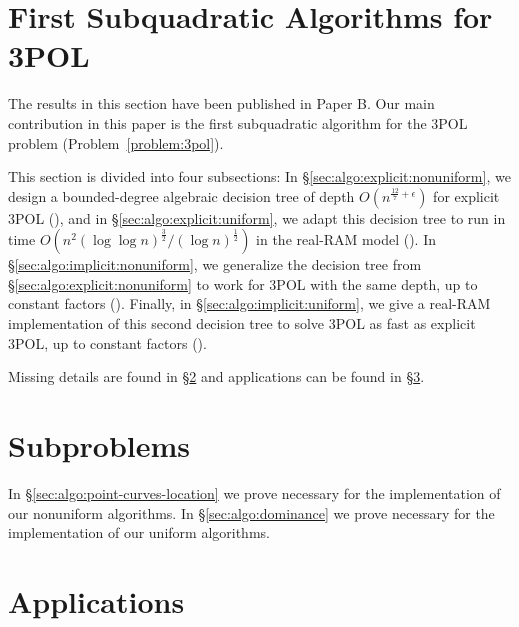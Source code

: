 \section{First Subquadratic Algorithms for 3POL}

The results in this section have been published in Paper B.
Our main contribution in this paper is the first subquadratic algorithm for
the 3POL problem (Problem~\ref{problem:3pol}).

This section is divided into four subsections:
%
In \S\ref{sec:algo:explicit:nonuniform},
we design a bounded-degree
algebraic decision tree
of depth $O(n^{\frac{12}{7}+\epsilon})$
for explicit 3POL (), and in
\S\ref{sec:algo:explicit:uniform}, we adapt this decision tree
to run in time $O(n^2 {(\log \log n)}^{\frac 32} / {(\log n)}^{\frac 12})$
in the real-RAM model ().
%
In \S\ref{sec:algo:implicit:nonuniform}, we generalize the decision tree from
\S\ref{sec:algo:explicit:nonuniform} to work for 3POL with the same depth, up
to constant factors ().
%
Finally, in \S\ref{sec:algo:implicit:uniform}, we give a real-RAM
implementation of this second decision tree to solve 3POL as fast as
explicit 3POL, up to constant factors ().

Missing details are found in
\S\ref{paper:3pol-algorithm:subproblems}
and applications can be found in \S\ref{sec:applications}.






\section{Subproblems}\label{paper:3pol-algorithm:subproblems}

In \S\ref{sec:algo:point-curves-location} we prove  necessary for the
implementation of our nonuniform algorithms.
%
In \S\ref{sec:algo:dominance} we prove  necessary for the
implementation of our uniform algorithms.




\section{Applications}%
\label{sec:applications}




